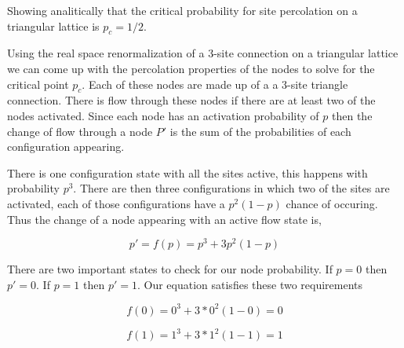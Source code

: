 Showing analitically that the critical probability for site percolation on a triangular lattice is $p_c = 1/2$.

Using the real space renormalization of a 3-site connection on a triangular lattice we can come up with the percolation properties of the nodes to solve for the critical point $p_c$. Each of these nodes are made up of a a 3-site triangle connection. There is flow through these nodes if there are at least two of the nodes activated. Since each node has an activation probability of $p$ then the change of flow through a node $P'$ is the sum of the probabilities of each configuration appearing.

There is one configuration state with all the sites active, this happens with probability $p^3$. There are then three configurations in which two of the sites are activated, each of those configurations have a $p^2 (1 - p)$ chance of occuring. Thus the change of a node appearing with an active flow state is,

\[
  p' = f(p) = p^3 + 3 p^2 (1 - p)  
\]

There are two important states to check for our node probability. If $p = 0$ then $p' = 0$. If $p = 1$ then $p' = 1$. Our equation satisfies these two requirements

\[
  f(0) = 0^3 + 3 * 0^2 (1 - 0) = 0
\]

\[
  f(1) = 1^3 + 3 * 1^2 (1 - 1) = 1
\]
